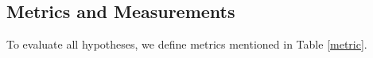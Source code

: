 \documentclass[11pt]{article}
\begin{document}
\subsection{Metrics and Measurements}
To evaluate all hypotheses, we define metrics mentioned in Table \ref{metric}.







 
\end{document}
